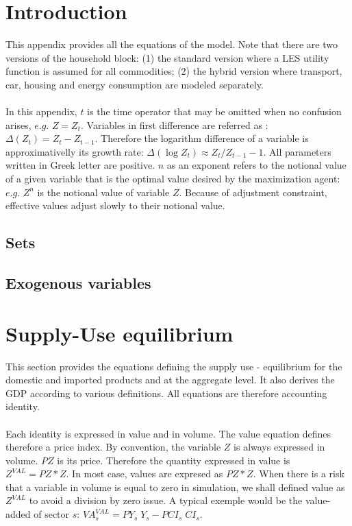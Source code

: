 \documentclass[12pt]{article}
\numberwithin{equation}{section}
\begin{document}
\section{Introduction}



This appendix provides all the equations of the model. Note that there are two versions of the household block: (1) the standard version where a LES utility function is assumed for all commodities; (2) the hybrid version where transport, car, housing and energy consumption are modeled separately. \\ \\
In this appendix, $t$ is the time operator that may be omitted when no confusion arises, $e.g.$ $Z = Z_{t}$. Variables in first difference are referred as : $\varDelta\left(Z_{t}\right) = Z_{t}-Z_{t-1}$. Therefore the logarithm difference of a variable is approximativelly its growth rate: $\varDelta\left(\operatorname{log} Z_{t}\right) \approx Z_{t}/Z_{t-1}-1$. All parameters written in Greek letter are positive. $n$ as an exponent refers to the notional value of a given variable that is the optimal value desired by the maximization agent: $e.g.$ $Z^{n}$ is the notional value of variable $Z$. Because of adjustment constraint, effective values adjust slowly to their notional value.



\subsection{Sets}





\subsection{Exogenous variables}




\section{Supply-Use equilibrium}



This section provides the equations defining the supply use - equilibrium for the domestic and imported products and at the aggregate level. It also derives the GDP according to various definitions. All equations are therefore accounting identity. \\  \\
Each identity is expressed in value and in volume. The value equation defines therefore a price index. By convention, the variable $Z$ is always expressed in volume. $PZ$ is its price. Therefore the quantity expressed in value is $Z^{VAL} = PZ * Z$. In most case, values are expresed as $PZ * Z$. When there is a risk that a variable in volume is equal to zero in simulation, we shall defined value as $Z^{VAL}$ to avoid a division by zero issue. A typical exemple would be the value-added of sector $s$: $VA^{VAL}_{s} = PY_{s} \; Y_{s} - PCI_{s} \; CI_{s}$.
\end{document}
